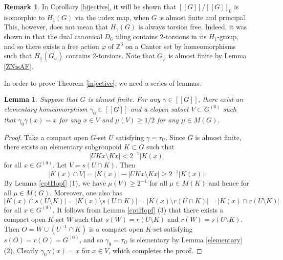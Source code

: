 \documentclass[11pt]{article}
\newtheorem{lem}[thm]{Lemma}
\theoremstyle{definition}
\newtheorem{rem}[thm]{Remark}
\renewcommand{\phi}{\varphi}
\newcommand{\Z}{\mathbb{Z}}
\begin{document}
\begin{rem}
In Corollary \ref{bijective}, it will be shown that 
$[[G]]/[[G]]_0$ is isomorphic to $H_1(G)$ via the index map, 
when $G$ is almost finite and principal. 
This, however, does not mean that $H_1(G)$ is always torsion free. 
Indeed, it was shown in \cite[Section 6.4]{GHK} that 
the dual canonical $D_6$ tiling contains $2$-torsions in its $H_1$-group, 
and so there exists a free action $\phi$ of $\Z^3$ on a Cantor set 
by homeomorphisms such that $H_1(G_\phi)$ contains $2$-torsions. 
Note that $G_\phi$ is almost finite by Lemma \ref{ZNisAF}. 
\end{rem}

In order to prove Theorem \ref{injective}, we need a series of lemmas. 

\begin{lem}\label{decomp1}
Suppose that $G$ is almost finite. 
For any $\gamma\in[[G]]$, 
there exist an elementary homeomorphism $\gamma_0\in[[G]]$ and 
a clopen subset $V\subset G^{(0)}$ such that 
$\gamma_0\gamma(x)=x$ for any $x\in V$ and 
$\mu(V)\geq1/2$ for any $\mu\in M(G)$. 
\end{lem}
\begin{proof}
Take a compact open $G$-set $U$ satisfying $\gamma=\tau_U$. 
Since $G$ is almost finite, 
there exists an elementary subgroupoid $K\subset G$ such that 
\[
\lvert UKx\setminus Kx\rvert<2^{-1}\lvert K(x)\rvert
\]
for all $x\in G^{(0)}$. 
Let $V=s(U\cap K)$. 
Then 
\[
\lvert K(x)\cap V\rvert=\lvert K(x)\rvert-\lvert UKx\setminus Kx\rvert
\geq2^{-1}\lvert K(x)\rvert. 
\]
By Lemma \ref{cptHopf} (1), 
we have $\mu(V)\geq2^{-1}$ for all $\mu\in M(K)$ 
and hence for all $\mu\in M(G)$. 
Moreover, one also has 
\[
\lvert K(x)\cap s(U\setminus K)\rvert
=\lvert K(x)\setminus s(U\cap K)\rvert
=\lvert K(x)\setminus r(U\cap K)\rvert
=\lvert K(x)\cap r(U\setminus K)\rvert
\]
for all $x\in G^{(0)}$. 
It follows from Lemma \ref{cptHopf} (3) that 
there exists a compact open $K$-set $W$ such that 
$s(W)=r(U\setminus K)$ and $r(W)=s(U\setminus K)$. 
Then $O=W\cup(U^{-1}\cap K)$ is a compact open $K$-set 
satisfying $s(O)=r(O)=G^{(0)}$, 
and so $\gamma_0=\tau_O$ is elementary by Lemma \ref{elementary} (2). 
Clearly $\gamma_0\gamma(x)=x$ for $x\in V$, 
which completes the proof. 
\end{proof}
\end{document}
